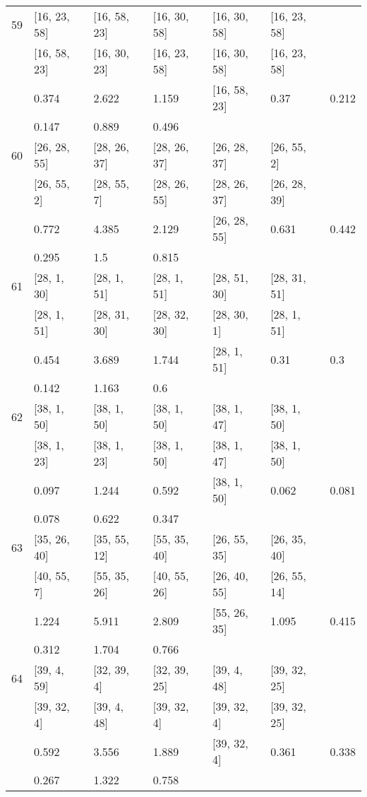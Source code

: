 \begin{longtable}{| l || l | l | l | l | l | l | }
\hline
59  & [16, 23, 58] & [16, 58, 23] & [16, 30, 58] & [16, 30, 58] & [16, 23, 58] \\
 & [16, 58, 23] & [16, 30, 23] & [16, 23, 58] & [16, 30, 58] & [16, 23, 58]\\
\hline
& 0.374 & 2.622 & 1.159 & [16, 58, 23] & 0.37 & 0.212\\
\hline
& 0.147 & 0.889 & 0.496 \\
\hline

\hline
60  & [26, 28, 55] & [28, 26, 37] & [28, 26, 37] & [26, 28, 37] & [26, 55, 2] \\
 & [26, 55, 2] & [28, 55, 7] & [28, 26, 55] & [28, 26, 37] & [26, 28, 39]\\
\hline
& 0.772 & 4.385 & 2.129 & [26, 28, 55] & 0.631 & 0.442\\
\hline
& 0.295 & 1.5 & 0.815 \\
\hline

\hline
61  & [28, 1, 30] & [28, 1, 51] & [28, 1, 51] & [28, 51, 30] & [28, 31, 51] \\
 & [28, 1, 51] & [28, 31, 30] & [28, 32, 30] & [28, 30, 1] & [28, 1, 51]\\
\hline
& 0.454 & 3.689 & 1.744 & [28, 1, 51] & 0.31 & 0.3\\
\hline
& 0.142 & 1.163 & 0.6 \\
\hline

\hline
62  & [38, 1, 50] & [38, 1, 50] & [38, 1, 50] & [38, 1, 47] & [38, 1, 50] \\
 & [38, 1, 23] & [38, 1, 23] & [38, 1, 50] & [38, 1, 47] & [38, 1, 50]\\
\hline
& 0.097 & 1.244 & 0.592 & [38, 1, 50] & 0.062 & 0.081\\
\hline
& 0.078 & 0.622 & 0.347 \\
\hline

\hline
63  & [35, 26, 40] & [35, 55, 12] & [55, 35, 40] & [26, 55, 35] & [26, 35, 40] \\
 & [40, 55, 7] & [55, 35, 26] & [40, 55, 26] & [26, 40, 55] & [26, 55, 14]\\
\hline
& 1.224 & 5.911 & 2.809 & [55, 26, 35] & 1.095 & 0.415\\
\hline
& 0.312 & 1.704 & 0.766 \\
\hline

\hline
64  & [39, 4, 59] & [32, 39, 4] & [32, 39, 25] & [39, 4, 48] & [39, 32, 25] \\
 & [39, 32, 4] & [39, 4, 48] & [39, 32, 4] & [39, 32, 4] & [39, 32, 25]\\
\hline
& 0.592 & 3.556 & 1.889 & [39, 32, 4] & 0.361 & 0.338\\
\hline
& 0.267 & 1.322 & 0.758 \\
\hline


\end{longtable}
